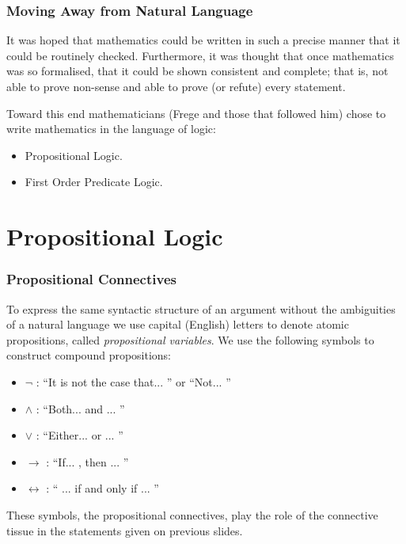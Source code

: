 \documentclass{beamer}
\theoremstyle{indentDefn} \newtheorem{defn}[]{Definition}
\begin{document}
\begin{frame}
	\frametitle{Moving Away from Natural Language}
	
	
	It was hoped that mathematics could be written in such a precise manner that it could be routinely checked. Furthermore, it was thought that once mathematics was so formalised, that it could be shown consistent and complete; that is, not able to prove non-sense and able to prove (or refute) every statement. 

	\vspace{1cm}

	Toward this end mathematicians (Frege and those that followed him) chose to write mathematics in the language of logic: 

	\begin{itemize}
		\item Propositional Logic.
		\item First Order Predicate Logic.
	\end{itemize}
	
	
\end{frame}

\section{Propositional Logic}

\begin{frame}
	\frametitle{Propositional Connectives}
	
	To express the same syntactic structure of an argument without the ambiguities of a natural language we use capital (English) letters to denote atomic propositions, called \emph{propositional variables}. We use the following symbols to construct compound propositions: 
	
	\vspace{0.5cm}
	
	\begin{itemize}
		\item $\lnot$ : ``It is not the case that... '' or ``Not... ''
		\item $\land$ : ``Both... and ... '' 
		\item $\lor$ : ``Either... or ... ''
		\item $\rightarrow$ : ``If... , then ... ''
		\item $\leftrightarrow$ : `` ... if and only if ... ''
	\end{itemize}

	These symbols, the propositional connectives, play the role of the connective tissue in the statements given on previous slides. 
	
\end{frame}
\end{document}
